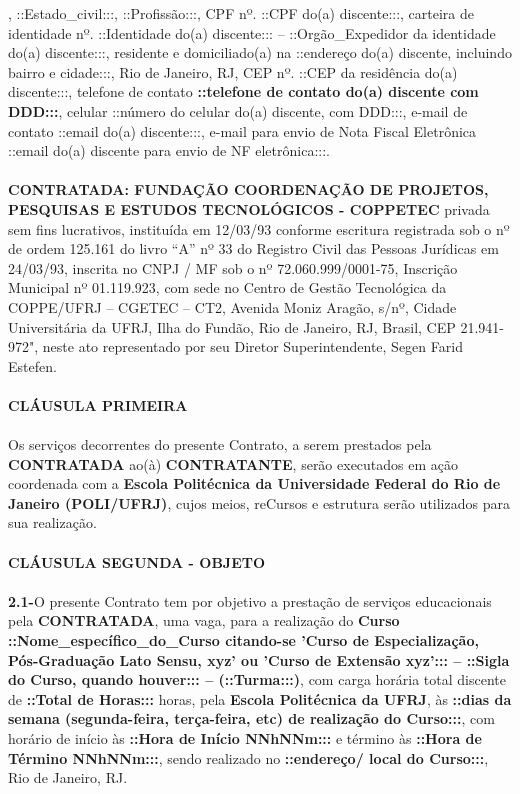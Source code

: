 \documentclass[a4paper,7.5pt]{article}
\begin{document}
\fontsize{7.5}{9}\selectfont
\justifying
{}, ::Estado\_civil:::, ::Profissão:::, CPF nº. ::CPF do(a) discente:::, carteira de identidade nº. ::Identidade do(a) discente::: – ::Orgão\_Expedidor da identidade do(a) discente:::, residente e domiciliado(a) na ::endereço do(a) discente, incluindo bairro e cidade:::, Rio de Janeiro, RJ, CEP nº.  ::CEP da residência do(a) discente:::, telefone de contato {\bf::telefone de contato do(a) discente com DDD:::}, celular ::número do celular do(a) discente, com DDD:::, e-mail de contato ::email do(a) discente:::, e-mail para envio de Nota Fiscal Eletrônica ::email do(a) discente para envio de NF eletrônica:::.
\\\\
{\bf CONTRATADA: FUNDAÇÃO COORDENAÇÃO DE PROJETOS, PESQUISAS E ESTUDOS TECNOLÓGICOS - COPPETEC} privada sem fins lucrativos, instituída em 12/03/93 conforme escritura registrada sob o nº de ordem 125.161 do livro “A” nº 33 do Registro Civil das Pessoas Jurídicas em 24/03/93, inscrita no CNPJ / MF sob o nº 72.060.999/0001-75, Inscrição Municipal nº 01.119.923, com sede no Centro de Gestão Tecnológica da COPPE/UFRJ – CGETEC – CT2, Avenida Moniz Aragão, s/nº, Cidade Universitária da UFRJ, Ilha do Fundão, Rio de Janeiro, RJ, Brasil, CEP 21.941-972", neste ato representado por seu Diretor Superintendente, Segen Farid Estefen.
\\\\
{\bf CLÁUSULA PRIMEIRA}
\\\\
\indent Os serviços decorrentes do presente Contrato, a serem prestados pela {\bf CONTRATADA} ao(à) {\bf CONTRATANTE}, serão executados em ação coordenada com a {\bf Escola Politécnica da Universidade Federal do Rio de Janeiro (POLI/UFRJ)}, cujos meios, reCursos e estrutura serão utilizados para sua realização.
\\\\
 {\bf CLÁUSULA SEGUNDA - OBJETO}
\\\\
{\bf 2.1-}\indent O presente Contrato tem por objetivo a prestação de serviços educacionais pela {\bf CONTRATADA}, uma vaga, para a realização do {\bf Curso ::Nome\_específico\_do\_Curso citando-se 'Curso de Especialização, Pós-Graduação Lato Sensu, xyz' ou 'Curso de Extensão xyz'::: – ::Sigla do Curso, quando houver::: – (::Turma:::)}, com carga horária total discente de {\bf ::Total de Horas:::} horas, pela {\bf Escola Politécnica da UFRJ}, às {\bf ::dias da semana (segunda-feira, terça-feira, etc) de realização do Curso:::}, com horário de início às {\bf ::Hora de Início NNhNNm:::} e término às {\bf::Hora de Término NNhNNm:::}, sendo realizado no {\bf::endereço/ local do Curso:::}, Rio de Janeiro, RJ.
\end{document}
